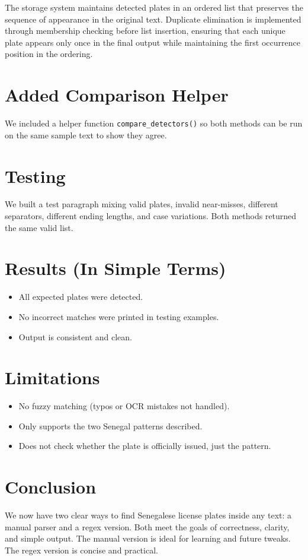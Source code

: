 \documentclass[12pt,a4paper]{article}
\begin{document}
\noindent The storage system maintains detected plates in an ordered list that preserves the sequence of appearance in the original text. Duplicate elimination is implemented through membership checking before list insertion, ensuring that each unique plate appears only once in the final output while maintaining the first occurrence position in the ordering.

\section{Added Comparison Helper}
We included a helper function \texttt{compare\_detectors()} so both methods can be run on the same sample text to show they agree.

\section{Testing}
We built a test paragraph mixing valid plates, invalid near-misses, different separators, different ending lengths, and case variations. Both methods returned the same valid list.

\section{Results (In Simple Terms)}
\begin{itemize}
    \item All expected plates were detected.
    \item No incorrect matches were printed in testing examples.
    \item Output is consistent and clean.
\end{itemize}

\section{Limitations}
\begin{itemize}
    \item No fuzzy matching (typos or OCR mistakes not handled).
    \item Only supports the two Senegal patterns described.
    \item Does not check whether the plate is officially issued, just the pattern.
\end{itemize}

\section{Conclusion}
We now have two clear ways to find Senegalese license plates inside any text: a manual parser and a regex version. Both meet the goals of correctness, clarity, and simple output. The manual version is ideal for learning and future tweaks. The regex version is concise and practical.
\end{document}

